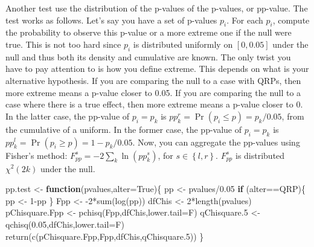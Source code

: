 \documentclass[
]{book}
\newenvironment{Shaded}{\begin{snugshade}}{\end{snugshade}}
\newcommand{\AttributeTok}[1]{\textcolor[rgb]{0.77,0.63,0.00}{#1}}
\newcommand{\ControlFlowTok}[1]{\textcolor[rgb]{0.13,0.29,0.53}{\textbf{#1}}}
\newcommand{\DecValTok}[1]{\textcolor[rgb]{0.00,0.00,0.81}{#1}}
\newcommand{\FloatTok}[1]{\textcolor[rgb]{0.00,0.00,0.81}{#1}}
\newcommand{\FunctionTok}[1]{\textcolor[rgb]{0.00,0.00,0.00}{#1}}
\newcommand{\NormalTok}[1]{#1}
\newcommand{\OtherTok}[1]{\textcolor[rgb]{0.56,0.35,0.01}{#1}}
\newcommand{\SpecialCharTok}[1]{\textcolor[rgb]{0.00,0.00,0.00}{#1}}
\newcommand{\StringTok}[1]{\textcolor[rgb]{0.31,0.60,0.02}{#1}}
\theoremstyle{definition}
\theoremstyle{definition}
\theoremstyle{definition}
\theoremstyle{definition}
\theoremstyle{remark}
\begin{document}
Another test use the distribution of the p-values of the p-values, or pp-value.
The test works as follows.
Let's say you have a set of p-values \(p_i\).
For each \(p_i\), compute the probability to observe this p-value or a more extreme one if the null were true.
This is not too hard since \(p_i\) is distributed uniformly on \(\left[0,0.05\right]\) under the null and thus both its density and cumulative are known.
The only twist you have to pay attention to is how you define extreme.
This depends on what is your alternative hypothesis.
If you are comparing the null to a case with QRPs, then more extreme means a p-value closer to 0.05.
If you are comparing the null to a case where there is a true effect, then more extreme means a p-value closer to 0.
In the latter case, the pp-value of \(p_i=p_k\) is \(pp^r_k=\Pr(p_i\leq p)=p_k/0.05\), from the cumulative of a uniform.
In the former case, the pp-value of \(p_i=p_k\) is \(pp^l_k=\Pr(p_i\geq p)=1-p_k/0.05\).
Now, you can aggregate the pp-values using Fisher's method: \(F_{pp}^s=-2\sum_k\ln(pp^s_k)\), for \(s\in\left\{l,r\right\}\).
\(F_{pp}^s\) is distributed \(\chi^2(2k)\) under the null.

\begin{Shaded}
\begin{Highlighting}[]
\NormalTok{pp.test }\OtherTok{\textless{}{-}} \ControlFlowTok{function}\NormalTok{(pvalues,}\AttributeTok{alter=}\StringTok{\textquotesingle{}True\textquotesingle{}}\NormalTok{)\{}
\NormalTok{  pp }\OtherTok{\textless{}{-}}\NormalTok{ pvalues}\SpecialCharTok{/}\FloatTok{0.05}
  \ControlFlowTok{if}\NormalTok{ (alter}\SpecialCharTok{==}\StringTok{\textquotesingle{}QRP\textquotesingle{}}\NormalTok{)\{}
\NormalTok{    pp }\OtherTok{\textless{}{-}} \DecValTok{1}\SpecialCharTok{{-}}\NormalTok{pp}
\NormalTok{  \}}
\NormalTok{  Fpp }\OtherTok{\textless{}{-}} \SpecialCharTok{{-}}\DecValTok{2}\SpecialCharTok{*}\FunctionTok{sum}\NormalTok{(}\FunctionTok{log}\NormalTok{(pp))}
\NormalTok{  dfChis }\OtherTok{\textless{}{-}} \DecValTok{2}\SpecialCharTok{*}\FunctionTok{length}\NormalTok{(pvalues)}
\NormalTok{  pChisquare.Fpp }\OtherTok{\textless{}{-}} \FunctionTok{pchisq}\NormalTok{(Fpp,dfChis,}\AttributeTok{lower.tail=}\NormalTok{F)}
\NormalTok{  qChisquare}\FloatTok{.5} \OtherTok{\textless{}{-}} \FunctionTok{qchisq}\NormalTok{(}\FloatTok{0.05}\NormalTok{,dfChis,}\AttributeTok{lower.tail=}\NormalTok{F)}
  \FunctionTok{return}\NormalTok{(}\FunctionTok{c}\NormalTok{(pChisquare.Fpp,Fpp,dfChis,qChisquare}\FloatTok{.5}\NormalTok{))}
\NormalTok{\}}
\end{Highlighting}
\end{Shaded}
\end{document}
